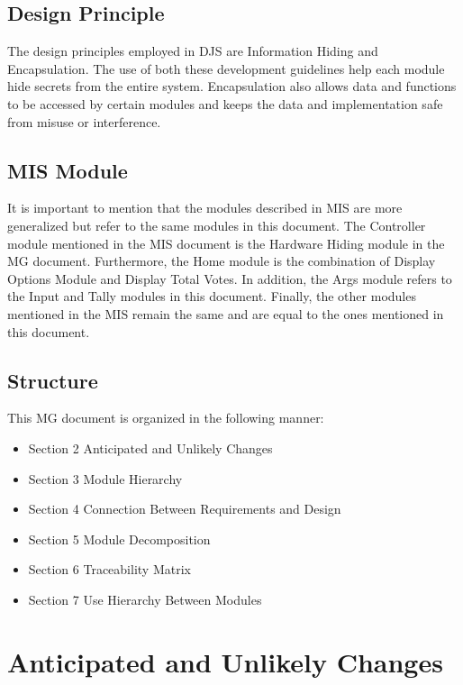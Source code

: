 \documentclass[12pt, titlepage]{article}
\begin{document}
\subsection{Design Principle}
The design principles employed in DJS are Information Hiding and Encapsulation. The use of both these development guidelines help each module hide secrets from the entire system. Encapsulation also allows data and functions to be accessed by certain modules and keeps the data and implementation safe from misuse or interference.
\subsection{MIS Module}
It is important to mention that the modules described in MIS are more generalized but refer to the same modules in this document. The Controller module mentioned in the MIS document is the Hardware Hiding module in the MG document. Furthermore, the Home module is the combination of Display Options Module and Display Total Votes. In addition, the Args module refers to the Input and Tally modules in this document. Finally, the other modules mentioned in the MIS remain the same and are equal to the ones mentioned in this document.

\subsection{Structure}
This MG document is organized in the following manner:
\renewcommand\labelitemii{$\square$}
\begin{itemize}


\item Section 2 Anticipated and Unlikely Changes
\item Section 3 Module Hierarchy


\item Section 4 Connection Between Requirements and Design


\item Section 5 Module Decomposition


\item Section 6 Traceability Matrix


\item Section 7 Use Hierarchy Between Modules




\end{itemize}




\section{Anticipated and Unlikely Changes} \label{SecChange}
\end{document}

